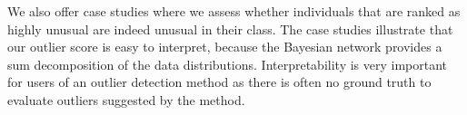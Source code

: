 \documentclass[conference]{IEEEtran}
\begin{document}
We also offer case studies where we assess whether individuals that are ranked as highly unusual are  indeed unusual in their class. 
The case studies illustrate that our outlier score is easy to interpret, because the Bayesian network provides a sum decomposition of the data distributions. Interpretability is very important for users of an outlier detection method as there is often no ground truth to 
evaluate outliers suggested by the method. %

%
%
\end{document}
